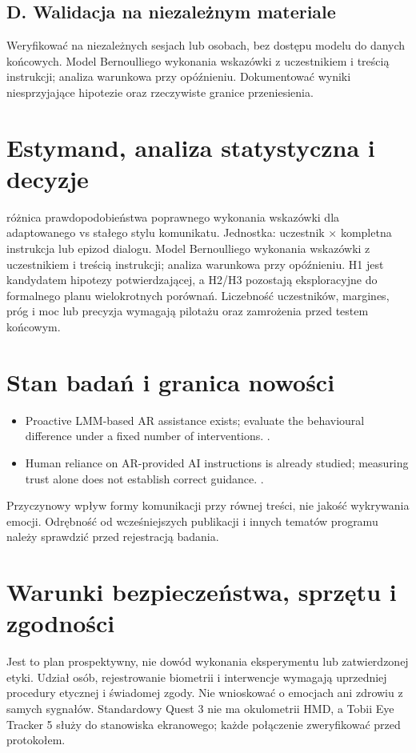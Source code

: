 \documentclass[11pt,a4paper]{article}
\begin{document}
\subsection{D. Walidacja na niezależnym materiale}
Weryfikować na niezależnych sesjach lub osobach, bez dostępu modelu do danych końcowych. Model Bernoulliego wykonania wskazówki z uczestnikiem i treścią instrukcji; analiza warunkowa przy opóźnieniu. Dokumentować wyniki niesprzyjające hipotezie oraz rzeczywiste granice przeniesienia.
\section{Estymand, analiza statystyczna i decyzje}
różnica prawdopodobieństwa poprawnego wykonania wskazówki dla adaptowanego vs stałego stylu komunikatu. Jednostka: uczestnik × kompletna instrukcja lub epizod dialogu. Model Bernoulliego wykonania wskazówki z uczestnikiem i treścią instrukcji; analiza warunkowa przy opóźnieniu. H1 jest kandydatem hipotezy potwierdzającej, a H2/H3 pozostają eksploracyjne do formalnego planu wielokrotnych porównań. Liczebność uczestników, margines, próg i moc lub precyzja wymagają pilotażu oraz zamrożenia przed testem końcowym.
\section{Stan badań i granica nowości}
\begin{itemize}
\item Proactive LMM-based AR assistance exists; evaluate the behavioural difference under a fixed number of interventions. \cite{xrprior1}.
\item Human reliance on AR-provided AI instructions is already studied; measuring trust alone does not establish correct guidance. \cite{xrprior2}.
\end{itemize}
Przyczynowy wpływ formy komunikacji przy równej treści, nie jakość wykrywania emocji. Odrębność od wcześniejszych publikacji i innych tematów programu należy sprawdzić przed rejestracją badania.
\section{Warunki bezpieczeństwa, sprzętu i zgodności}
Jest to plan prospektywny, nie dowód wykonania eksperymentu lub zatwierdzonej etyki. Udział osób, rejestrowanie biometrii i interwencje wymagają uprzedniej procedury etycznej i świadomej zgody. Nie wnioskować o emocjach ani zdrowiu z samych sygnałów. Standardowy Quest 3 nie ma okulometrii HMD, a Tobii Eye Tracker 5 służy do stanowiska ekranowego; każde połączenie zweryfikować przed protokołem.
\end{document}
